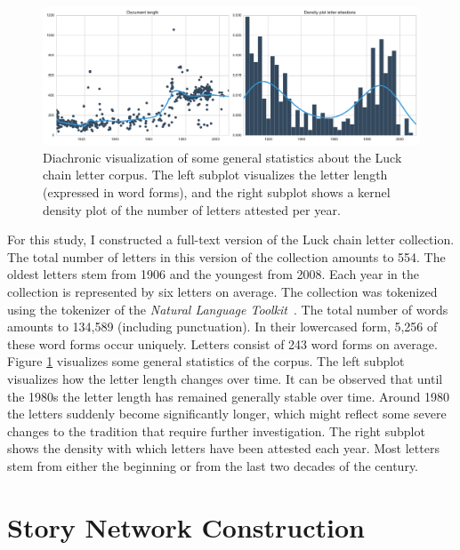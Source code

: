 \begin{figure}
  \centering
  \includegraphics[width=\textwidth]{images/luck-statistics.pdf}
  \caption{Diachronic visualization of some general statistics about the Luck chain letter corpus. The left subplot visualizes the letter length (expressed in word forms), and the right subplot shows a kernel density plot of the number of letters attested per year.}
  \label{fig:luck-statistics}
\end{figure}

For this study, I constructed a full-text version of the Luck chain letter collection\autocite{folgert_karsdorp_2016_51588}. The total number of letters in this version of the collection amounts to 554. The oldest letters stem from 1906 and the youngest from 2008. Each year in the collection is represented by six letters on average. The collection was tokenized using the tokenizer of the \emph{Natural Language Toolkit}~\autocite{bird:2009}. The total number of words amounts to 134,589 (including punctuation). In their lowercased form, 5,256 of these word forms occur uniquely. Letters consist of 243 word forms on average. Figure \ref{fig:luck-statistics} visualizes some general statistics of the corpus. The left subplot visualizes how the letter length changes over time. It can be observed that until the 1980s the letter length has remained generally stable over time. Around 1980 the letters suddenly become significantly longer, which might reflect some severe changes to the tradition that require further investigation. The right subplot shows the density with which letters have been attested each year. Most letters stem from either the beginning or from the last two decades of the  century. 

\section{Story Network Construction}\label{sec:networks}

